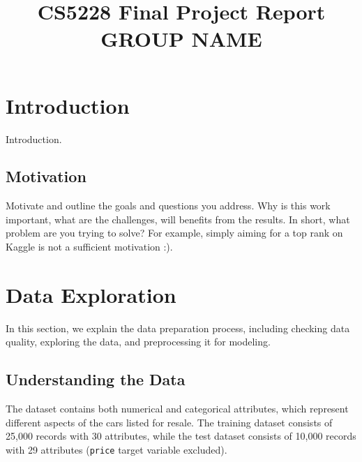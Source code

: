 \documentclass[conference]{IEEEtran}
\begin{document}
\title{CS5228 Final Project Report\\
GROUP NAME}

\author{
\and
{}
\IEEEauthorblockA{
 \\
}
\and
{}
\IEEEauthorblockA{
 \\
}
}

\maketitle

\begin{abstract}
    
\end{abstract}
\section{Introduction}
\label{sec:introduction}
Introduction.
\subsection{Motivation}
Motivate and outline the goals and questions you address. Why is this work important, what are the challenges, will benefits from the results. In short, what problem are you trying to solve? For example, simply aiming for a top rank on Kaggle is not a sufficient motivation :).

\section{Data Exploration}
\label{sec:data_exploration}
In this section, we explain the data preparation process, including checking data quality, exploring the data, and preprocessing it for modeling.

\subsection{Understanding the Data}
The dataset contains both numerical and categorical attributes, which represent different aspects of the cars listed for resale. 
The training dataset consists of 25,000 records with 30 attributes, while the test dataset consists of 10,000 records with 29 attributes (\texttt{price} target variable excluded).
\end{document}
